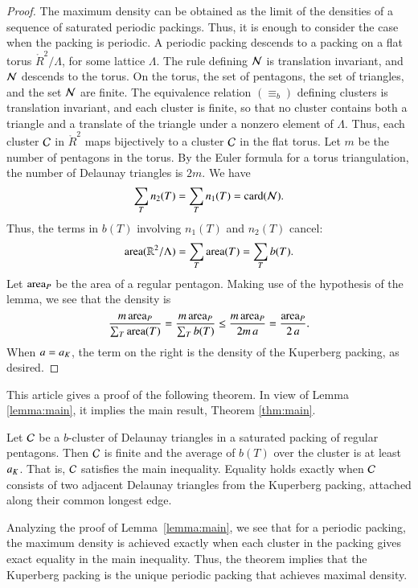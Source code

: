\begin{proof} The maximum density can be obtained as the limit of the
  densities of a sequence of saturated periodic packings.  Thus, it is
  enough to consider the case when the packing is periodic.  A
  periodic packing descends to a packing on a flat torus
  $\ring{R}^2/\Lambda$, for some lattice $\Lambda$.  The rule defining
  $\mathcal N$ is translation invariant, and $\mathcal N$ descends to the torus.  On
  the torus, the set of pentagons, the set of triangles, and the set
  $\mathcal N$ are finite.  The equivalence relation $(\equiv_b)$ defining
  clusters is translation invariant, and each cluster is finite, so
  that no cluster contains both a triangle and a translate of the
  triangle under a nonzero element of $\Lambda$.  Thus, each cluster
  $\mathcal C$ in $\ring{R}^2$ maps bijectively to a cluster $\mathcal C$ in the flat
  torus.  Let $m$ be the number of pentagons in the torus.  By the
  Euler formula for a torus triangulation, the number of Delaunay
  triangles is $2m$.  We have
\[
\sum_{T} n_2(T) =  \sum_{T} n_1(T) = 
{\operatorname{card}}(\mathcal N).
\]
Thus, the terms in $b(T)$ involving $n_1(T)$ and $n_2(T)$ cancel:
\[
{\operatorname{area}}(\mathbb{R}^2/\Lambda) = \sum_T {\operatorname{area}}(T) = \sum_T b(T).
\]    
Let ${\operatorname{area}}_P$ be the area of a regular pentagon.  Making use of the
hypothesis of the lemma, we see that the density is
\[
\frac{m\, {\operatorname{area}}_P}{\sum_T {\operatorname{area}}(T)} 
=\frac{m\, {\operatorname{area}}_P}{\sum_T b(T)} \le\frac{m\, {\operatorname{area}}_P}{2 m\, a} 
= \frac{{\operatorname{area}}_P}{2\, a}.
\]
When $a=a_K$, the term on the right is the density of the Kuperberg
packing, as desired.
\end{proof}

This article gives a proof of the following theorem. In view of Lemma \ref{lemma:main},
it implies the main result, Theorem \ref{thm:main}.

\begin{theorem}\label{conj:main}
  Let $\mathcal C$ be a $b$-cluster of Delaunay triangles in a saturated
  packing of regular pentagons.  Then $\mathcal C$ is finite and the average
  of $b(T)$ over the cluster is at least $a_K$.  That is, $\mathcal C$
  satisfies the main inequality.  Equality holds exactly when $\mathcal C$
  consists of two adjacent Delaunay triangles from the Kuperberg
  packing, attached along their common longest edge.
\end{theorem}

Analyzing the proof of Lemma~\ref{lemma:main}, we see that for a
periodic packing, the maximum density is achieved exactly when each
 cluster in the packing gives exact equality in the main inequality.
Thus, the theorem implies that the Kuperberg packing is the
unique periodic packing that achieves maximal density.




